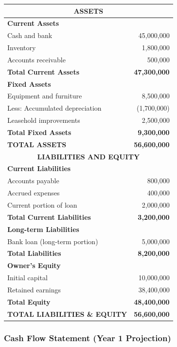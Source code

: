 \begin{tabular}{|l|r|}
\hline
\multicolumn{2}{|c|}{\textbf{ASSETS}} \\
\hline
\textbf{Current Assets} & \\
Cash and bank & 45,000,000 \\
Inventory & 1,800,000 \\
Accounts receivable & 500,000 \\
\hline
\textbf{Total Current Assets} & \textbf{47,300,000} \\
\hline
\textbf{Fixed Assets} & \\
Equipment and furniture & 8,500,000 \\
Less: Accumulated depreciation & (1,700,000) \\
Leasehold improvements & 2,500,000 \\
\hline
\textbf{Total Fixed Assets} & \textbf{9,300,000} \\
\hline
\textbf{TOTAL ASSETS} & \textbf{56,600,000} \\
\hline
\multicolumn{2}{|c|}{\textbf{LIABILITIES AND EQUITY}} \\
\hline
\textbf{Current Liabilities} & \\
Accounts payable & 800,000 \\
Accrued expenses & 400,000 \\
Current portion of loan & 2,000,000 \\
\hline
\textbf{Total Current Liabilities} & \textbf{3,200,000} \\
\hline
\textbf{Long-term Liabilities} & \\
Bank loan (long-term portion) & 5,000,000 \\
\hline
\textbf{Total Liabilities} & \textbf{8,200,000} \\
\hline
\textbf{Owner's Equity} & \\
Initial capital & 10,000,000 \\
Retained earnings & 38,400,000 \\
\hline
\textbf{Total Equity} & \textbf{48,400,000} \\
\hline
\textbf{TOTAL LIABILITIES \& EQUITY} & \textbf{56,600,000} \\
\hline
\end{tabular}

\subsubsection{Cash Flow Statement (Year 1 Projection)}

